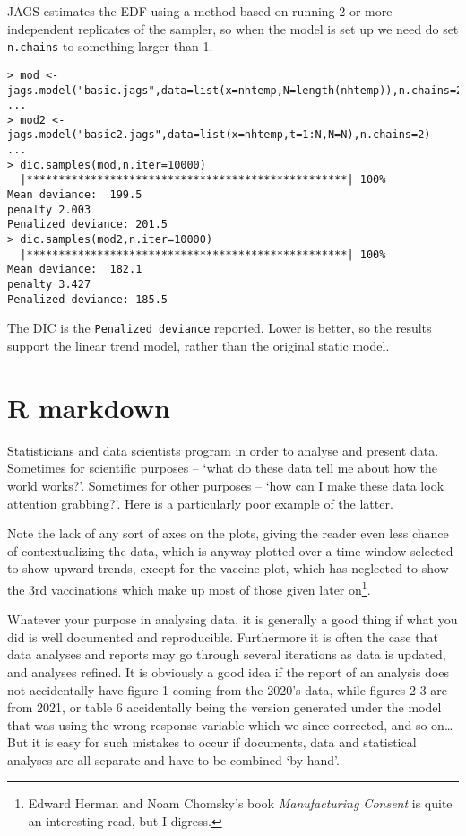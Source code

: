 \documentclass[10pt] {article}
\newcommand{\eps}[3]
{{\begin{center}
 \rotatebox{#1}{\scalebox{#2}{\texttt{[image: \#3]}}}
 \end{center}}
}
\theoremstyle{definition}
\begin{document}
JAGS estimates the EDF using a method based on running 2 or more independent replicates of the sampler, so when the model is set up we need do set {\tt n.chains} to something larger than 1.
\begin{lstlisting}
> mod <- jags.model("basic.jags",data=list(x=nhtemp,N=length(nhtemp)),n.chains=2)
...
> mod2 <- jags.model("basic2.jags",data=list(x=nhtemp,t=1:N,N=N),n.chains=2)
...
> dic.samples(mod,n.iter=10000)
  |**************************************************| 100%
Mean deviance:  199.5 
penalty 2.003 
Penalized deviance: 201.5 
> dic.samples(mod2,n.iter=10000)
  |**************************************************| 100%
Mean deviance:  182.1 
penalty 3.427 
Penalized deviance: 185.5 
\end{lstlisting}
The DIC is the {\tt Penalized deviance} reported. Lower is better, so the results support the linear trend model, rather than the original static model. 



\section{R markdown}

Statisticians and data scientists program in order to analyse and present data. Sometimes for scientific purposes -- `what do these data tell me about how the world works?'. Sometimes for other purposes -- `how can I make these data look attention grabbing?'. Here is a particularly poor example of the latter. 
\eps{0}{.2}{BBC2021-10-25}
Note the lack of any sort of axes on the plots, giving the reader even less chance of contextualizing the data, which is anyway plotted over a time window selected to show upward trends, except for the vaccine plot, which has neglected to show the 3rd vaccinations which make up most of those given later on\footnote{Edward Herman and Noam Chomsky's book {\em Manufacturing Consent} is quite an interesting read, but I digress.}.   

Whatever your purpose in analysing data, it is generally a good thing if what you did is well documented and reproducible. Furthermore it is often the case that data analyses and reports may go through several iterations as data is updated, and analyses refined. It is obviously a good idea if the report of an analysis does not accidentally have figure 1 coming from the 2020's data, while figures 2-3 are from 2021, or table 6 accidentally being the version generated under the model that was using the wrong response variable which we since corrected, and so on\ldots But it is easy for such mistakes to occur if documents, data and statistical analyses are all separate and have to be combined `by hand'. 
\end{document}
